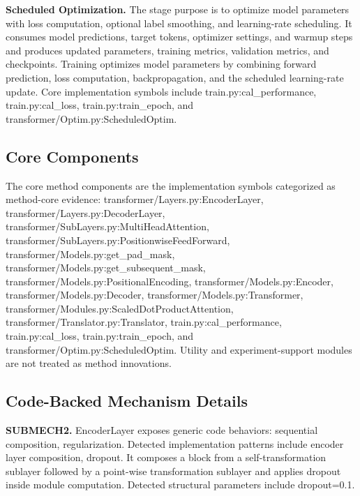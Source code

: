 \textbf{Scheduled Optimization.} The stage purpose is to optimize model parameters with loss computation, optional label smoothing, and learning-rate scheduling. It consumes model predictions, target tokens, optimizer settings, and warmup steps and produces updated parameters, training metrics, validation metrics, and checkpoints. Training optimizes model parameters by combining forward prediction, loss computation, backpropagation, and the scheduled learning-rate update. Core implementation symbols include train.py:cal\_performance, train.py:cal\_loss, train.py:train\_epoch, and transformer/Optim.py:ScheduledOptim.

\subsection{Core Components}
The core method components are the implementation symbols categorized as method-core evidence: transformer/Layers.py:EncoderLayer, transformer/Layers.py:DecoderLayer, transformer/SubLayers.py:MultiHeadAttention, transformer/SubLayers.py:PositionwiseFeedForward, transformer/Models.py:get\_pad\_mask, transformer/Models.py:get\_subsequent\_mask, transformer/Models.py:PositionalEncoding, transformer/Models.py:Encoder, transformer/Models.py:Decoder, transformer/Models.py:Transformer, transformer/Modules.py:ScaledDotProductAttention, transformer/Translator.py:Translator, train.py:cal\_performance, train.py:cal\_loss, train.py:train\_epoch, and transformer/Optim.py:ScheduledOptim. Utility and experiment-support modules are not treated as method innovations.

\subsection{Code-Backed Mechanism Details}
\textbf{SUBMECH2.} EncoderLayer exposes generic code behaviors: sequential composition, regularization. Detected implementation patterns include encoder layer composition, dropout. It composes a block from a self-transformation sublayer followed by a point-wise transformation sublayer and applies dropout inside module computation. Detected structural parameters include dropout=0.1.

